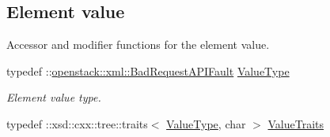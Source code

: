 \subsection*{Element value}
\label{_amgrp2ee2eae1a8c390ea033f241c027da8d6}
Accessor and modifier functions for the element value. \begin{DoxyCompactItemize}
\item 
\hypertarget{classopenstack_1_1xml_1_1BadRequest_a8a56961632556675f196f6c1848735ae}{
typedef ::\hyperlink{classopenstack_1_1xml_1_1BadRequestAPIFault}{openstack::xml::BadRequestAPIFault} \hyperlink{classopenstack_1_1xml_1_1BadRequest_a8a56961632556675f196f6c1848735ae}{ValueType}}
\label{classopenstack_1_1xml_1_1BadRequest_a8a56961632556675f196f6c1848735ae}

\begin{DoxyCompactList}\small\item\em Element value type. \item\end{DoxyCompactList}\item 
\hypertarget{classopenstack_1_1xml_1_1BadRequest_a1eb65d04b3eee00e63e8dcc54d54a731}{
typedef ::xsd::cxx::tree::traits$<$ \hyperlink{classopenstack_1_1xml_1_1BadRequestAPIFault}{ValueType}, char $>$ \hyperlink{classopenstack_1_1xml_1_1BadRequest_a1eb65d04b3eee00e63e8dcc54d54a731}{ValueTraits}}
\label{classopenstack_1_1xml_1_1BadRequest_a1eb65d04b3eee00e63e8dcc54d54a731}


\end{DoxyCompactItemize}
